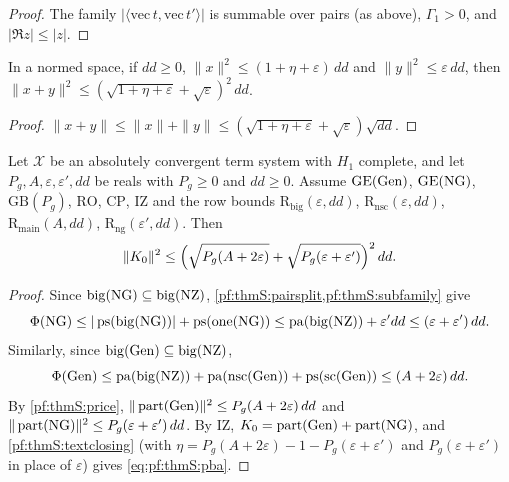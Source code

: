 \begin{proof}
The family $|\langle\mathrm{vec}\,t,\mathrm{vec}\,t'\rangle|$ is summable over pairs (as above), $\Gamma_1>0$, and
$|\Re z|\le|z|$.
\end{proof}

\begin{lemma}\label{pf:thmS:textclosing}
In a normed space, if $dd\ge0$, $\|x\|^2\le(1+\eta+\varepsilon)\,dd$ and $\|y\|^2\le\varepsilon\,dd$, then
$\|x+y\|^2\le(\sqrt{1+\eta+\varepsilon}+\sqrt\varepsilon)^2\,dd$.
\end{lemma}

\begin{proof}
$\|x+y\|\le\|x\|+\|y\|\le(\sqrt{1+\eta+\varepsilon}+\sqrt\varepsilon)\sqrt{dd}$.
\end{proof}

\begin{proposition}\label{pf:thmS:pba}
Let $\mathcal X$ be an absolutely convergent term system with $H_1$ complete, and let $P_g,A,\varepsilon,\varepsilon',dd$
be reals with $P_g\ge0$ and $dd\ge0$. Assume $\mathrm{GE}(\mathrm{Gen})$, $\mathrm{GE}(\mathrm{NG})$,
$\mathrm{GB}(P_g)$, $\mathrm{RO}$, $\mathrm{CP}$, $\mathrm{IZ}$ and the row bounds
$\mathrm{R}_{\mathrm{big}}(\varepsilon,dd)$, $\mathrm{R}_{\mathrm{nsc}}(\varepsilon,dd)$, $\mathrm{R}_{\mathrm{main}}(A,dd)$,
$\mathrm{R}_{\mathrm{ng}}(\varepsilon',dd)$. Then
\begin{equation}\label{eq:pf:thmS:pba}
\|K_0\|^2\le\Bigl(\sqrt{P_g(A+2\varepsilon)}+\sqrt{P_g(\varepsilon+\varepsilon')}\Bigr)^2\,dd.
\end{equation}
\end{proposition}

\begin{proof}
Since $\mathrm{big}(\mathrm{NG})\subseteq\mathrm{big}(\mathrm{NZ})$, \cref{pf:thmS:pairsplit,pf:thmS:subfamily} give
\[
\Phi(\mathrm{NG})\le|\operatorname{ps}(\mathrm{big}(\mathrm{NG}))|+\operatorname{ps}(\mathrm{one}(\mathrm{NG}))
\le\operatorname{pa}(\mathrm{big}(\mathrm{NZ}))+\varepsilon'dd\le(\varepsilon+\varepsilon')\,dd.
\]
Similarly, since $\mathrm{big}(\mathrm{Gen})\subseteq\mathrm{big}(\mathrm{NZ})$,
\[
\Phi(\mathrm{Gen})\le\operatorname{pa}(\mathrm{big}(\mathrm{NZ}))+\operatorname{pa}(\mathrm{nsc}(\mathrm{Gen}))+\operatorname{ps}(\mathrm{sc}(\mathrm{Gen}))
\le(A+2\varepsilon)\,dd.
\]
By \cref{pf:thmS:price}, $\|\operatorname{part}(\mathrm{Gen})\|^2\le P_g(A+2\varepsilon)\,dd$ and
$\|\operatorname{part}(\mathrm{NG})\|^2\le P_g(\varepsilon+\varepsilon')\,dd$. By $\mathrm{IZ}$,
$K_0=\operatorname{part}(\mathrm{Gen})+\operatorname{part}(\mathrm{NG})$, and \cref{pf:thmS:textclosing} (with
$\eta=P_g(A+2\varepsilon)-1-P_g(\varepsilon+\varepsilon')$ and $P_g(\varepsilon+\varepsilon')$ in place of
$\varepsilon$) gives \eqref{eq:pf:thmS:pba}.
\end{proof}

